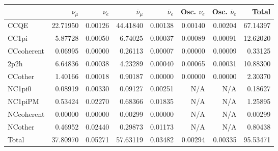 \begin{tabular} { | l ||r | r | r | r | r | r | | r | }
\hline
              & $\nu_\mu$            & $\nu_e$              & $\bar{\nu}_{\mu}$    & $\bar{\nu}_{e}$      & Osc. $\nu_e$         & Osc. $\bar{\nu}_{e}$ & Total                \\ \hline\hline
 CCQE         & 22.71950             & 0.00126              & 44.41840             & 0.00138              & 0.00140              & 0.00204              & 67.14397             \\ \hline
 CC1pi        & 5.87728              & 0.00050              & 6.74025              & 0.00037              & 0.00089              & 0.00091              & 12.62020             \\ \hline
 CCcoherent   & 0.06995              & 0.00000              & 0.26113              & 0.00007              & 0.00000              & 0.00009              & 0.33125              \\ \hline
 2p2h         & 6.64836              & 0.00038              & 4.23289              & 0.00040              & 0.00065              & 0.00031              & 10.88300             \\ \hline
 CCother      & 1.40166              & 0.00018              & 0.90187              & 0.00000              & 0.00000              & 0.00000              & 2.30370              \\ \hline
 NC1pi0       & 0.08919              & 0.00330              & 0.09127              & 0.00251              & N/A                  & N/A                  & 0.18627              \\ \hline
 NC1piPM      & 0.53424              & 0.02270              & 0.68366              & 0.01835              & N/A                  & N/A                  & 1.25895              \\ \hline
 NCcoherent   & 0.00000              & 0.00000              & 0.00299              & 0.00000              & N/A                  & N/A                  & 0.00299              \\ \hline
 NCother      & 0.46952              & 0.02440              & 0.29873              & 0.01173              & N/A                  & N/A                  & 0.80438              \\ \hline
\hline
 Total        & 37.80970             & 0.05271              & 57.63119             & 0.03482              & 0.00294              & 0.00335              & 95.53471             \\ \hline

\end{tabular}
